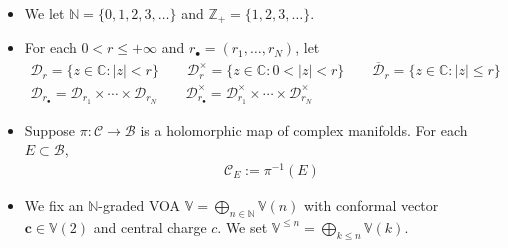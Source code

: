 \documentclass[11pt,b5paper,notitlepage]{article}
\theoremstyle{definition}
\theoremstyle{plain}
\newcommand{\mc}{\mathcal}
\newcommand{\ovl}{\overline}
\newcommand{\blt}{\bullet}
\newcommand{\Vbb}{\mathbb V}
\newcommand{\Cbb}{\mathbb C}
\newcommand{\Nbb}{\mathbb N}
\newcommand{\Zbb}{\mathbb Z}
\newcommand{\cbf}{\mathbf c}
\newcommand{\<}{\left\langle}
\renewcommand{\>}{\right\rangle}
\newcommand{\MC}{\mathcal{C}}
\newcommand{\MB}{\mathcal{B}}
\newcommand{\MD}{\mathcal{D}}
\numberwithin{equation}{subsection}
\begin{document}
\begin{itemize}
\item We let $\Nbb=\{0,1,2,3,\dots\}$ and $\Zbb_+=\{1,2,3,\dots\}$.
\item For each $0<r\leq+\infty$ and $r_\blt=(r_1,\dots,r_N)$, let
\begin{gather*}
\mc D_r=\{z\in\Cbb:|z|<r\}\qquad \mc D_r^\times=\{z\in\Cbb:0<|z|<r\}\qquad\ovl{\mc D}_r=\{z\in\Cbb:|z|\leq r\}\\
\MD_{r_\blt}=\MD_{r_1}\times\cdots\times\MD_{r_N}\qquad \MD^\times_{r_\blt}=\MD^\times_{r_1}\times\cdots\times\MD^\times_{r_N}
\end{gather*}


    \item Suppose $\pi:\MC\rightarrow \MB$ is a holomorphic map of complex manifolds. For each $E\subset\MB$, 
    \begin{align*}
 \quad \MC_E:=\pi^{-1}(E)
    \end{align*}


\item We fix an $\Nbb$-graded VOA $\Vbb=\bigoplus_{n\in\Nbb}\Vbb(n)$ with conformal vector $\cbf\in\Vbb(2)$  and central charge $c$. We set $\Vbb^{\leq n}=\bigoplus_{k\leq n}\Vbb(k)$. 


\end{itemize}
\end{document}
